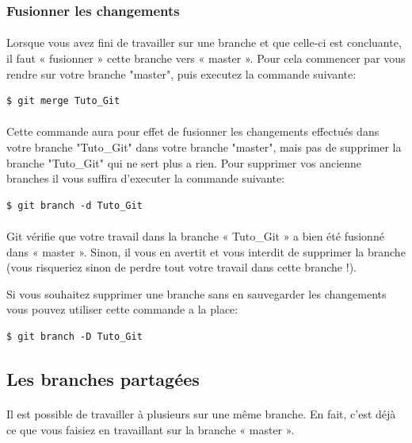 \documentclass[french, a4paper, 12pt, titlepage]{article}
\begin{document}
\subsubsection{Fusionner les changements}
\paragraph{}Lorsque vous avez fini de travailler sur une branche et que celle-ci est concluante, il faut « fusionner » cette branche vers « master ». Pour cela commencer par vous rendre sur votre branche "master", puis executez la commande suivante:
\begin{lstlisting}
$ git merge Tuto_Git
\end{lstlisting}

\paragraph{}Cette commande aura pour effet de fusionner les changements effectués dans votre branche "Tuto\_Git" dans votre branche "master", mais pas de supprimer la branche "Tuto\_Git" qui ne sert plus a rien. Pour supprimer vos ancienne branches il vous suffira d'executer la commande suivante:
\begin{lstlisting}
$ git branch -d Tuto_Git
\end{lstlisting}

\paragraph{}Git vérifie que votre travail dans la branche « Tuto\_Git » a bien été fusionné dans « master ». Sinon, il vous en avertit et vous interdit de supprimer la branche (vous risqueriez sinon de perdre tout votre travail dans cette branche !).

Si vous souhaitez supprimer une branche sans en sauvegarder les changements vous pouvez utiliser cette commande a la place:
\begin{lstlisting}
$ git branch -D Tuto_Git
\end{lstlisting}

\subsection{Les branches partagées}
\paragraph{}Il est possible de travailler à plusieurs sur une même branche. En fait, c’est déjà ce que vous faisiez en travaillant sur la branche « master ».
\end{document}
